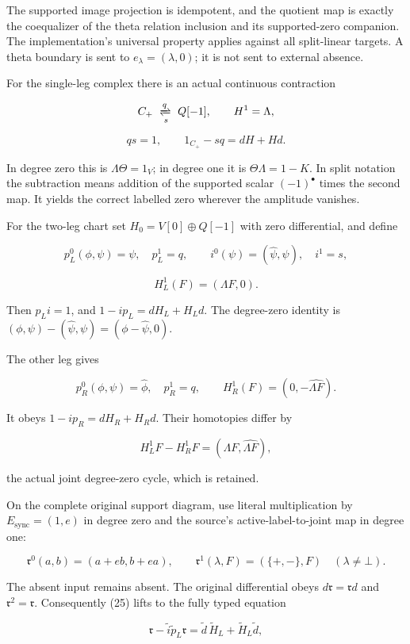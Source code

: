 The supported image projection is idempotent, and the quotient map is exactly the coequalizer of the
theta relation inclusion and its supported-zero companion. The implementation's universal property
applies against all split-linear targets. A theta boundary is sent to \(e_\lambda=(\lambda,0)\); it
is not sent to external absence.

For the single-leg complex there is an actual continuous contraction

\[C_+\ \xrightleftharpoons[s]{q}\ Q[-1],\qquad H^1=\Lambda,\]

\[\boxed{q s=1,\qquad 1_{C_+}-s q=dH+Hd.}\tag{24}\]

In degree zero this is \(\Lambda\Theta=1_V\); in degree one it is \(\Theta\Lambda=1-K\). In split
notation the subtraction means addition of the supported scalar \((-1)^\bullet\) times the second
map. It yields the correct labelled zero wherever the amplitude vanishes.

For the two-leg chart set \(H_0=V[0]\oplus Q[-1]\) with zero differential, and define

\[p_L^0(\phi,\psi)=\psi,\quad p_L^1=q,\qquad
i^0(\psi)=(\widehat\psi,\psi),\quad i^1=s,\]

\[H_L^1(F)=(\Lambda F,0).\tag{25}\]

Then \(p_L i=1\), and \(1-i p_L=dH_L+H_Ld\). The degree-zero identity is
\((\phi,\psi)-(\widehat\psi,\psi)=(\phi-\widehat\psi,0)\).

The other leg gives

\[p_R^0(\phi,\psi)=\widehat\phi,\quad p_R^1=q,\qquad
H_R^1(F)=(0,-\widehat{\Lambda F}).\tag{26}\]

It obeys \(1-i p_R=dH_R+H_Rd\). Their homotopies differ by

\[\boxed{H_L^1F-H_R^1F=(\Lambda F,\widehat{\Lambda F}),}\tag{27}\]

the actual joint degree-zero cycle, which is retained.

On the complete original support diagram, use literal multiplication by \(E_{\mathrm{sync}}=(1,e)\)
in degree zero and the source's active-label-to-joint map in degree one:

\[\mathfrak r^0(a,b)=(a+eb,b+ea),\qquad
\mathfrak r^1(\lambda,F)=(\{+,-\},F)\quad(\lambda\ne\bot).\]

The absent input remains absent. The original differential obeys \(d\mathfrak r=\mathfrak r d\) and
\(\mathfrak r^2=\mathfrak r\). Consequently (25) lifts to the fully typed equation

\[\boxed{\mathfrak r-\widetilde i\widetilde p_L\mathfrak r
=\widetilde d\,\widetilde H_L+\widetilde H_L\widetilde d,}\tag{28}\]

